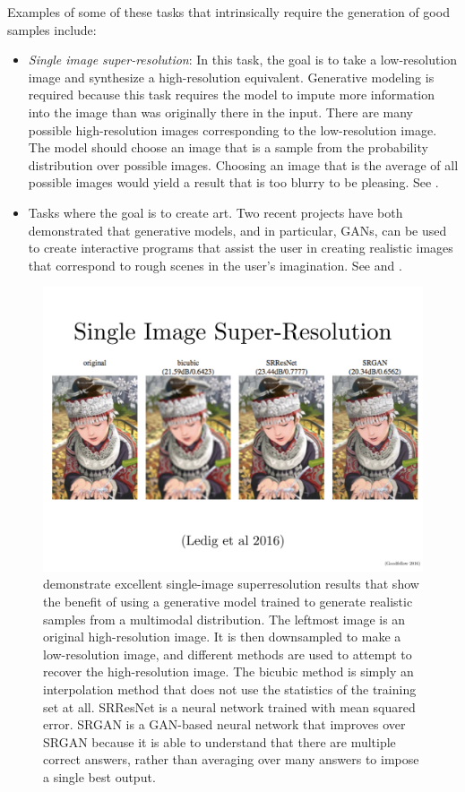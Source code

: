 Examples of some of these tasks that intrinsically require the generation of good
samples include:
\begin{itemize}
  \item {\em Single image super-resolution}: In this task, the goal is to take a
    low-resolution image and synthesize a high-resolution equivalent.
    Generative modeling is required because this task requires the model to impute
    more information into the image than was originally there in the input.
    There are many possible high-resolution images corresponding to the low-resolution
    image.
    The model should choose an image that is a sample from the probability distribution
    over possible images.
    Choosing an image that is the average of all possible images would yield a result
    that is too blurry to be pleasing.
    See .

  \item Tasks where the goal is to create art.
    Two recent projects have both demonstrated that generative models, and in particular,
    GANs, can be used to create interactive programs that assist the user in creating
    realistic images that correspond to rough scenes in the user's imagination.
    See  and .

\end{itemize}

\begin{figure}
  \centering
  \includegraphics[width=\textwidth]{superres}
  \caption{
\citet{Ledig16} demonstrate excellent single-image superresolution results that show
the benefit of using a generative model trained to generate realistic samples from
 a multimodal distribution.
 The leftmost image is an original high-resolution image.
 It is then downsampled to make a low-resolution image, and different methods
 are used to attempt to recover the high-resolution image.
 The bicubic method is simply an interpolation method that does not use 
 the statistics of the training set at all.
 SRResNet is a neural network trained with mean squared error.
 SRGAN is a GAN-based neural network that improves over SRGAN because it is able
 to understand that there are multiple correct answers, rather than averaging
 over many answers to impose a single best output.
  }
  \label{fig:superres}
\end{figure}

